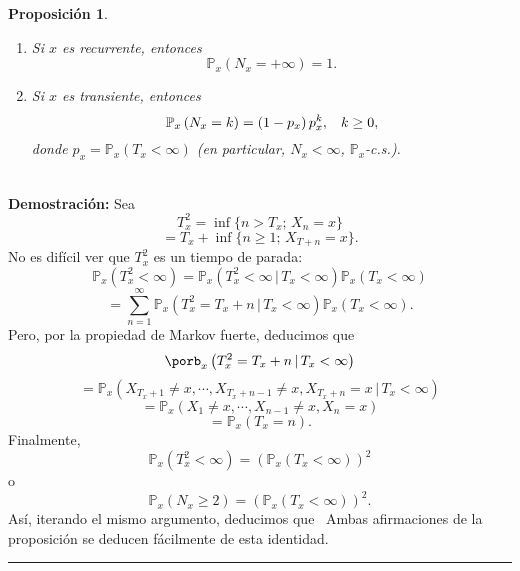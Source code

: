 \documentclass[a4paper]{article}
\newcommand{\prob}{\mathbb{P}}
\newtheorem{prop}{Proposici\'on}
\numberwithin{equation}{subsection}
\numberwithin{definicion}{subsection}
\begin{document}
 \begin{prop}
    \begin{enumerate}
        \item[a)] Si $x$ es recurrente, entonces
        \[\prob_x\left(N_x = +\infty\right) = 1.\]
        \item[b)] Si $x$ es transiente, entonces
        \[\prob_x\left(N_x =k\right) = \left(1 - p_x\right)p_x^k,\hspace{0.3cm}k\geq 0,\]
        donde $p_x = \prob_x\left(T_x<\infty\right)$ (en particular, $N_x<\infty$, $\prob_x$-c.s.).
    \end{enumerate}
 \end{prop}\\ \newline
\textbf{Demostración: }Sea 
\[T_x^2 = \inf\{n> T_x;\,X_n=x\}\]
\[= T_x + \inf\{n\geq 1;\,X_{T+n}=x\}.\]
No es difícil ver que $T_x^2$ es un tiempo de parada:
\[\prob_x\left(T_x^2 < \infty\right) = \prob_x\left(T_x^2<\infty\,|\,T_x<\infty\right)\prob_x\left(T_x<\infty\right)\]
\[= \sum_{n=1}^{\infty}\prob_x\left(T_x^2= T_x + n\,|\,T_x<\infty\right)\prob_x\left(T_x <\infty\right).\]
Pero, por la propiedad de Markov fuerte, deducimos que
\[\porb_x\left(T_x^2 = T_x +n\,|\,T_x<\infty\right)\]
\[=\prob_x\left(X_{T_x +1}\neq x,\cdots,X_{T_x +n-1}\neq x,X_{T_x +n}=x\,|\,T_x<\infty\right)\]
\[= \prob_x\left(X_1\neq x,\cdots,X_{n-1}\neq x,X_n=x\right)\]
\[=\prob_x\left(T_x=n\right).\]
Finalmente,
\[\prob_x\left(T_x^2<\infty\right)=(\prob_x\left(T_x<\infty\right))^2\]
o
\[\prob_x\left(N_x\geq 2\right) = (\prob_x\left(T_x<\infty\right))^2.\]
Así, iterando el mismo argumento, deducimos que
\
Ambas afirmaciones de la proposición se deducen fácilmente de esta identidad.\\
\rule{0.7em}{0.7em}\\ \newline
\end{document}
